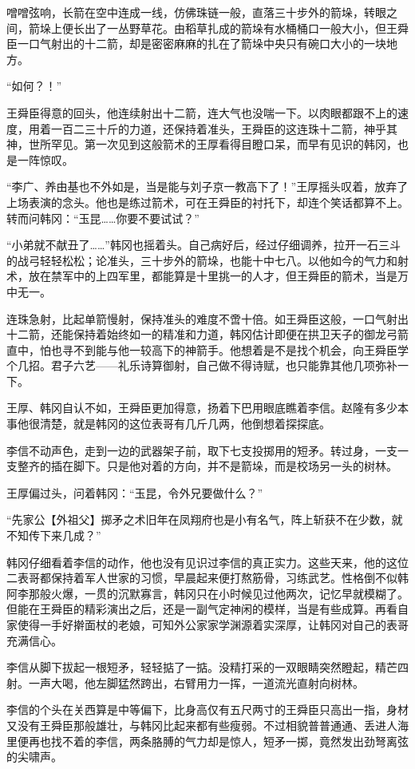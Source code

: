 噌噌弦响，长箭在空中连成一线，仿佛珠链一般，直落三十步外的箭垛，转眼之间，箭垛上便长出了一丛野草花。由稻草扎成的箭垛有水桶桶口一般大小，但王舜臣一口气射出的十二箭，却是密密麻麻的扎在了箭垛中央只有碗口大小的一块地方。

“如何？！”

王舜臣得意的回头，他连续射出十二箭，连大气也没喘一下。以肉眼都跟不上的速度，用着一百二三十斤的力道，还保持着准头，王舜臣的这连珠十二箭，神乎其神，世所罕见。第一次见到这般箭术的王厚看得目瞪口呆，而早有见识的韩冈，也是一阵惊叹。

“李广、养由基也不外如是，当是能与刘子京一教高下了！”王厚摇头叹着，放弃了上场表演的念头。他也是练过箭术，可在王舜臣的衬托下，却连个笑话都算不上。转而问韩冈：“玉昆……你要不要试试？”

“小弟就不献丑了……”韩冈也摇着头。自己病好后，经过仔细调养，拉开一石三斗的战弓轻轻松松；论准头，三十步外的箭垛，也能十中七八。以他如今的气力和射术，放在禁军中的上四军里，都能算是十里挑一的人才，但王舜臣的箭术，当是万中无一。

连珠急射，比起单箭慢射，保持准头的难度不啻十倍。如王舜臣这般，一口气射出十二箭，还能保持着始终如一的精准和力道，韩冈估计即便在拱卫天子的御龙弓箭直中，怕也寻不到能与他一较高下的神箭手。他想着是不是找个机会，向王舜臣学个几招。君子六艺——礼乐诗算御射，自己做不得诗赋，也只能靠其他几项弥补一下。

王厚、韩冈自认不如，王舜臣更加得意，扬着下巴用眼底瞧着李信。赵隆有多少本事他很清楚，就是韩冈的这位表哥有几斤几两，他倒想着探探底。

李信不动声色，走到一边的武器架子前，取下七支投掷用的短矛。转过身，一支一支整齐的插在脚下。只是他对着的方向，并不是箭垛，而是校场另一头的树林。

王厚偏过头，问着韩冈：“玉昆，令外兄要做什么？”

“先家公【外祖父】掷矛之术旧年在凤翔府也是小有名气，阵上斩获不在少数，就不知传下来几成？”

韩冈仔细看着李信的动作，他也没有见识过李信的真正实力。这些天来，他的这位二表哥都保持着军人世家的习惯，早晨起来便打熬筋骨，习练武艺。性格倒不似韩阿李那般火爆，一贯的沉默寡言，韩冈只在小时候见过他两次，记忆早就模糊了。但能在王舜臣的精彩演出之后，还是一副气定神闲的模样，当是有些成算。再看自家使得一手好擀面杖的老娘，可知外公家家学渊源着实深厚，让韩冈对自己的表哥充满信心。

李信从脚下拔起一根短矛，轻轻掂了一掂。没精打采的一双眼睛突然瞪起，精芒四射。一声大喝，他左脚猛然跨出，右臂用力一挥，一道流光直射向树林。

李信的个头在关西算是中等偏下，比身高仅有五尺两寸的王舜臣只高出一指，身材又没有王舜臣那般雄壮，与韩冈比起来都有些瘦弱。不过相貌普普通通、丢进人海里便再也找不着的李信，两条胳膊的气力却是惊人，短矛一掷，竟然发出劲弩离弦的尖啸声。

